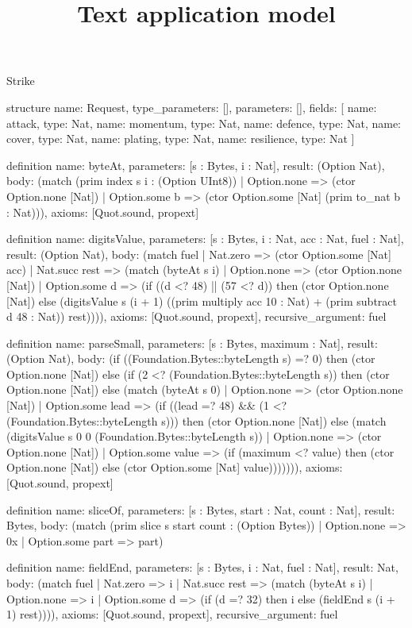 \begin{lexlean}{Strike}
\title{Text application model}
\begin{semanticmodule}
structure{
  name: Request,
  type_parameters: [],
  parameters: [],
  fields: [
    {name: attack, type: Nat},
    {name: momentum, type: Nat},
    {name: defence, type: Nat},
    {name: cover, type: Nat},
    {name: plating, type: Nat},
    {name: resilience, type: Nat}
  ]
}

definition{
  name: byteAt,
  parameters: [s : Bytes, i : Nat],
  result: (Option Nat),
  body: (match (prim index s i : (Option UInt8))
    | Option.none => (ctor Option.none [Nat])
    | Option.some b => (ctor Option.some [Nat] (prim to_nat b : Nat))),
  axioms: [Quot.sound, propext]
}

definition{
  name: digitsValue,
  parameters: [s : Bytes, i : Nat, acc : Nat, fuel : Nat],
  result: (Option Nat),
  body: (match fuel
    | Nat.zero => (ctor Option.some [Nat] acc)
    | Nat.succ rest => (match (byteAt s i)
      | Option.none => (ctor Option.none [Nat])
      | Option.some d => (if ((d <? 48) || (57 <? d)) then (ctor Option.none [Nat]) else (digitsValue s (i + 1) ((prim multiply acc 10 : Nat) + (prim subtract d 48 : Nat)) rest)))),
  axioms: [Quot.sound, propext],
  recursive_argument: fuel
}

definition{
  name: parseSmall,
  parameters: [s : Bytes, maximum : Nat],
  result: (Option Nat),
  body: (if ((Foundation.Bytes::byteLength s) =? 0) then (ctor Option.none [Nat]) else (if (2 <? (Foundation.Bytes::byteLength s)) then (ctor Option.none [Nat]) else (match (byteAt s 0)
    | Option.none => (ctor Option.none [Nat])
    | Option.some lead => (if ((lead =? 48) && (1 <? (Foundation.Bytes::byteLength s))) then (ctor Option.none [Nat]) else (match (digitsValue s 0 0 (Foundation.Bytes::byteLength s))
      | Option.none => (ctor Option.none [Nat])
      | Option.some value => (if (maximum <? value) then (ctor Option.none [Nat]) else (ctor Option.some [Nat] value))))))),
  axioms: [Quot.sound, propext]
}

definition{
  name: sliceOf,
  parameters: [s : Bytes, start : Nat, count : Nat],
  result: Bytes,
  body: (match (prim slice s start count : (Option Bytes))
    | Option.none => 0x
    | Option.some part => part)
}

definition{
  name: fieldEnd,
  parameters: [s : Bytes, i : Nat, fuel : Nat],
  result: Nat,
  body: (match fuel
    | Nat.zero => i
    | Nat.succ rest => (match (byteAt s i)
      | Option.none => i
      | Option.some d => (if (d =? 32) then i else (fieldEnd s (i + 1) rest)))),
  axioms: [Quot.sound, propext],
  recursive_argument: fuel
}


\end{semanticmodule}
\end{lexlean}
